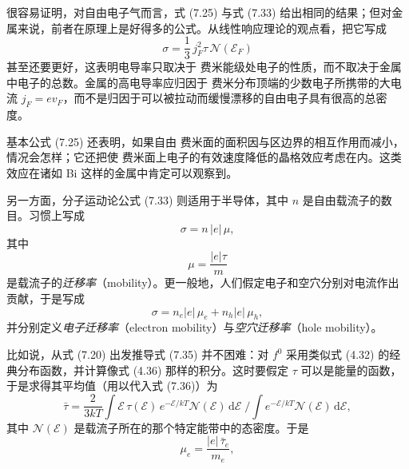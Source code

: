 很容易证明，对自由电子气而言，式 (7.25) 与式 (7.33) 给出相同的结果；但对金属来说，前者在原理上是好得多的公式。从线性响应理论的观点看，把它写成
\begin{equation*}
\sigma=\frac{1}{3}\,j_{F}^{2}\tau\,\mathcal{N}(\mathcal{E}_{F})\tag{7.34}
\end{equation*}
甚至还要更好，这表明电导率只取决于 费米能级处电子的性质，而不取决于金属中电子的总数。金属的高电导率应归因于 费米分布顶端的少数电子所携带的大电流 $j_{F}=ev_{F}$，而不是归因于可以被拉动而缓慢漂移的自由电子具有很高的总密度。

基本公式 (7.25) 还表明，如果自由 费米面的面积因与区边界的相互作用而减小，情况会怎样；它还把使 费米面上电子的有效速度降低的晶格效应考虑在内。这类效应在诸如 Bi 这样的金属中肯定可以观察到。

另一方面，分子运动论公式 (7.33) 则适用于半导体，其中 $n$ 是自由载流子的数目。习惯上写成
\begin{equation*}
\sigma=n\,|e|\,\mu,\tag{7.35}
\end{equation*}
其中
\begin{equation*}
\mu=\frac{|e|\tau}{m}\tag{7.36}
\end{equation*}
是载流子的\emph{迁移率}（mobility）。更一般地，人们假定电子和空穴分别对电流作出贡献，于是写成
\begin{equation*}
\sigma=n_{e}|e|\,\mu_{e}+n_{h}|e|\,\mu_{h},\tag{7.37}
\end{equation*}
并分别定义\emph{电子迁移率}（electron mobility）与\emph{空穴迁移率}（hole mobility）。

比如说，从式 (7.20) 出发推导式 (7.35) 并不困难：对 $f^{0}$ 采用类似式 (4.32) 的经典分布函数，并计算像式 (4.36) 那样的积分。这时要假定 $\tau$ 可以是能量的函数，于是求得其平均值（用以代入式 (7.36)）为
\begin{equation*}
\bar{\tau}=\frac{2}{3kT}\int\mathcal{E}\,\tau(\mathcal{E})\,e^{-\mathcal{E}/kT}\mathcal{N}(\mathcal{E})\,\mathrm{d}\mathcal{E}\;\bigg/\int e^{-\mathcal{E}/kT}\mathcal{N}(\mathcal{E})\,\mathrm{d}\mathcal{E},\tag{7.38}
\end{equation*}
其中 $\mathcal{N}(\mathcal{E})$ 是载流子所在的那个特定能带中的态密度。于是
\begin{equation*}
\mu_{e}=\frac{|e|\,\bar{\tau}_{e}}{m_{e}},\tag{7.39}
\end{equation*}
